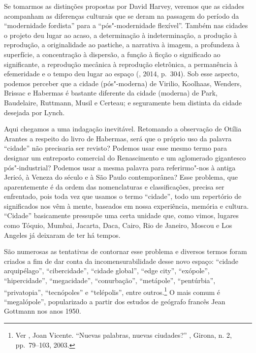 Se tomarmos as distinções propostas por David Harvey, veremos que as
cidades acompanham as diferenças culturais que se deram na passagem do
período da ``modernidade fordista'' para a ``pós"-modernidade flexível''.
Também nas cidades o projeto deu lugar ao acaso, a determinação à
indeterminação, a produção à reprodução, a originalidade ao pastiche,
a narrativa à imagem, a profundeza à superfície,
a concentração à dispersão, a função à ficção o
significado ao significante, a reprodução mecânica à reprodução
eletrônica, a permanência à efemeridade e o tempo deu lugar ao espaço
(, 2014, p.~304). Sob esse aspecto, podemos perceber que a cidade
(pós"-moderna) de Virilio, Koolhaas, Wenders, Brissac e Habermas
é bastante diferente da cidade (moderna) de Park, Baudelaire, Ruttmann,
Musil e Certeau; e seguramente bem distinta da cidade desejada por
Lynch.

Aqui chegamos a uma indagação inevitável. Retomando a observação de
Otília Arantes a respeito do livro de Habermas, será que o próprio uso
da palavra ``cidade'' não precisaria ser revisto? Podemos usar esse
mesmo termo para designar um entreposto comercial do Renascimento e um
aglomerado gigantesco pós"-industrial? Podemos usar a mesma palavra para
referirmo"-nos à antiga Jericó, à Veneza do século  e à São Paulo
contemporânea? Esse problema, que aparentemente é da ordem das
nomenclaturas e classificações, precisa ser enfrentado, pois toda vez
que usamos o termo ``cidade'', todo um repertório de significados nos
vêm à mente, baseados em nossa experiência, memória e cultura.
``Cidade'' basicamente pressupõe uma certa unidade que, como vimos,
lugares como Tóquio, Mumbai, Jacarta, Daca, Cairo, Rio de Janeiro,
Moscou e Los Angeles já deixaram de ter há tempos.

São numerosas as tentativas de contornar esse problema e diversos termos
foram criados a fim de dar conta da incomensurabilidade desse novo
espaço: ``cidade arquipélago'', ``cibercidade'', ``cidade global'', ``edge
city'', ``exópole'', ``hipercidade'', ``megacidade'', ``conurbação'',
``metápole'', ``pentúrbia'', ``privatopia'', ``tecnópoles'' e
``telépolis'', entre outros.\footnote{Ver , Joan Vicente. ``Nuevas
  palabras, nuevas ciudades?'' {}, Girona, n.
  2, pp.~79--103, 2003.} O mais comum é ``megalópole'', popularizado a
partir dos estudos de geógrafo francês Jean Gottmann nos anos 1950.

